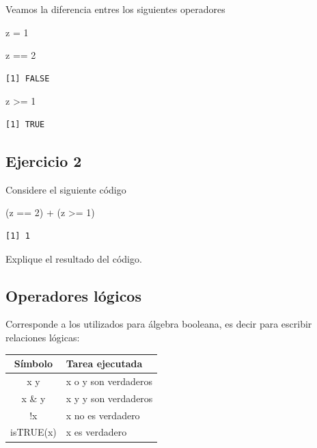 \documentclass[
  letterpaper,
  DIV=11,
  numbers=noendperiod]{scrartcl}
\newenvironment{Shaded}{\begin{snugshade}}{\end{snugshade}}
\newcommand{\DecValTok}[1]{\textcolor[rgb]{0.68,0.00,0.00}{#1}}
\newcommand{\NormalTok}[1]{\textcolor[rgb]{0.00,0.23,0.31}{#1}}
\newcommand{\OtherTok}[1]{\textcolor[rgb]{0.00,0.23,0.31}{#1}}
\newcommand{\SpecialCharTok}[1]{\textcolor[rgb]{0.37,0.37,0.37}{#1}}
\newcounter{none} %
\begin{document}
Veamos la diferencia entres los siguientes operadores

\begin{Shaded}
\begin{Highlighting}[]
\NormalTok{z }\OtherTok{=} \DecValTok{1}

\NormalTok{z }\SpecialCharTok{==} \DecValTok{2}
\end{Highlighting}
\end{Shaded}

\begin{verbatim}
[1] FALSE
\end{verbatim}

\begin{Shaded}
\begin{Highlighting}[]
\NormalTok{z }\SpecialCharTok{\textgreater{}=} \DecValTok{1}
\end{Highlighting}
\end{Shaded}

\begin{verbatim}
[1] TRUE
\end{verbatim}

\subsection{Ejercicio 2}\label{ejercicio-2}

Considere el siguiente código

\begin{Shaded}
\begin{Highlighting}[]
\NormalTok{(z }\SpecialCharTok{==} \DecValTok{2}\NormalTok{) }\SpecialCharTok{+}\NormalTok{ (z }\SpecialCharTok{\textgreater{}=} \DecValTok{1}\NormalTok{)}
\end{Highlighting}
\end{Shaded}

\begin{verbatim}
[1] 1
\end{verbatim}

Explique el resultado del código.

\subsection{Operadores lógicos}\label{operadores-luxf3gicos}

Corresponde a los utilizados para álgebra booleana, es decir para
escribir relaciones lógicas:

{\def\LTcaptype{none} %
\begin{longtable}[]{@{}cl@{}}
\toprule\noalign{}
Símbolo & Tarea ejecutada \\
\midrule\noalign{}
\endhead
\bottomrule\noalign{}
\endlastfoot
x \textbar{} y & x o y son verdaderos \\
x \& y & x y y son verdaderos \\
!x & x no es verdadero \\
isTRUE(x) & x es verdadero \\
\end{longtable}
}
\end{document}
